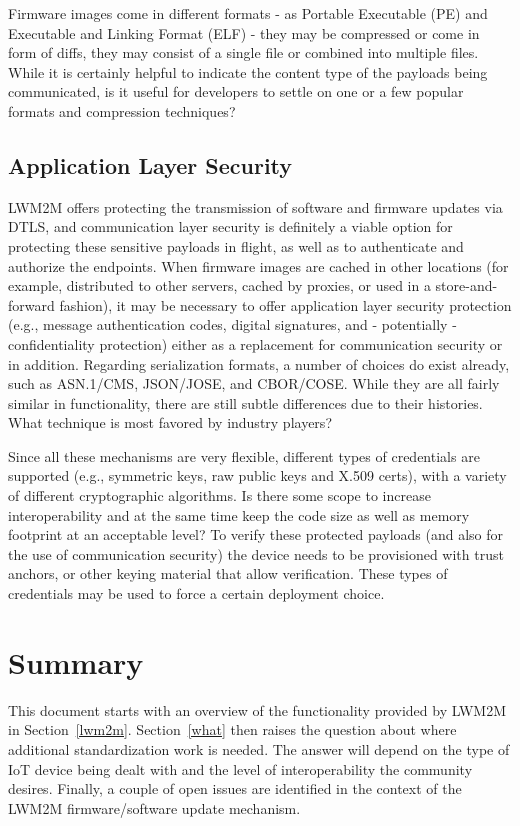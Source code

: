 \documentclass[peerreview, a4paper, 7pt]{IEEEtran}
\begin{document}
Firmware images come in different formats - as Portable Executable (PE) and Executable and Linking Format (ELF) - they may be compressed or come in form of diffs, they may consist of a single file or combined into multiple files. While it is certainly helpful to indicate the content type of the payloads being communicated, is it useful for developers to settle on one or a few popular formats and compression techniques?

\subsection{Application Layer Security}

LWM2M offers protecting the transmission of software and firmware updates via DTLS, and communication layer security is definitely a viable option for protecting these sensitive payloads in flight, as well as to authenticate and authorize the endpoints. When firmware images are cached in other locations (for example, distributed to other servers, cached by proxies, or used in a store-and-forward fashion), it may be necessary to offer application layer security protection (e.g., message authentication codes, digital signatures, and - potentially - confidentiality protection) either as a replacement for communication security or in addition. Regarding serialization formats, a number of choices do exist already, such as ASN.1/CMS, JSON/JOSE, and CBOR/COSE. While they are all fairly similar in functionality, there are still subtle differences due to their histories. What technique is most favored by industry players? 

Since all these mechanisms are very flexible, different types of credentials are supported (e.g., symmetric keys, raw public keys and X.509 certs), with a variety of different cryptographic algorithms. Is there some scope to increase interoperability and at the same time keep the code size as well as memory footprint at an acceptable level? To verify these protected payloads (and also for the use of communication security) the device needs to be provisioned with trust anchors, or other keying material that allow verification. These types of credentials may be used to force a certain deployment choice.

\section{Summary}
This document starts with an overview of the functionality provided by LWM2M in Section~\ref{lwm2m}. Section~\ref{what} then raises the question about where additional standardization work is needed. The answer will depend on the type of IoT device being dealt with and the level of interoperability the community desires. Finally, a couple of open issues are identified in the context of the LWM2M firmware/software update mechanism. 
\end{document}
